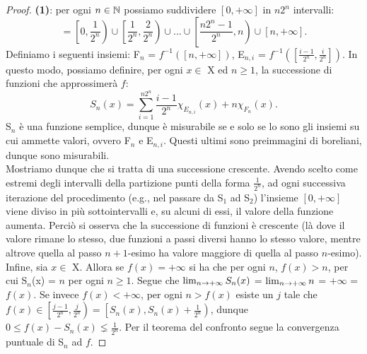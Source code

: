 \documentclass[Completo.tex]{subfiles}
\begin{document}
	\begin{proof}
		\textbf{(1)}: per ogni $n \in \bb[N]$ possiamo suddividere $[0, +\infty]$ in $n 2^n$ intervalli:
		\begin{equation*}
		[0, +\infty] = \left[0, \frac{1}{2^n}\right) \cup \left[\frac{1}{2^n}, \frac{2}{2^n}\right) \cup ... \cup \left[\frac{n2^n - 1}{2^n},n\right) \cup [n, +\infty].
		\end{equation*}
		Definiamo i seguenti insiemi: F$_n$ = $f^{-1}([n, +\infty])$, E$_{n,i}$ = $f^{-1}(\left[\frac{i-1}{2^n}, \frac{i}{2^n}\right])$. In questo modo, possiamo definire, per ogni $x \in$ X ed $n\geq1$, la successione di funzioni che approssimerà $f$:
		\begin{equation*}
		S_n(x) = \sum\limits_{i=1}^{n2^n}\frac{i-1}{2^n} \chi_{E_{n,i}}(x) + n\chi_{F_n}(x).
		\end{equation*}
		S$_n$ è una funzione semplice, dunque è misurabile se e solo se lo sono gli insiemi su cui ammette valori, ovvero F$_n$ e E$_{n,i}$. Questi ultimi sono preimmagini di boreliani, dunque sono misurabili. \\
		Mostriamo dunque che si tratta di una successione crescente. Avendo scelto come estremi degli intervalli della partizione punti della forma $\frac{1}{2^n}$, ad ogni successiva iterazione del procedimento (e.g., nel passare da S$_1$ ad S$_2$) l'insieme $[0, +\infty]$ viene diviso in più sottointervalli e, su alcuni di essi, il valore della funzione aumenta. Perciò si osserva che la successione di funzioni è crescente (là dove il valore rimane lo stesso, due funzioni a passi diversi hanno lo stesso valore, mentre altrove quella al passo $n+1$-esimo ha valore maggiore di quella al passo $n$-esimo). \\
		Infine, sia $x \in$ X. Allora se $f(x) = +\infty$ si ha che per ogni $n$, $f(x) > n$, per cui S$_n$(x) = $n$ per ogni $n\geq1$. Segue che $\lim_{n \rightarrow +\infty}S_n(x)$ = $\lim_{n \rightarrow +\infty} n$ = $+\infty$ = $f(x)$. Se invece $f(x) < +\infty$, per ogni $n > f(x)$ esiste un $j$ tale che $f(x) \in \left[\frac{j-1}{2^n}, \frac{j}{2^n}\right) = \left[S_n(x), S_n(x) + \frac{1}{2^n}\right)$, dunque $0 \leq f(x) - S_n(x) \lneq \frac{1}{2^n}$. Per il teorema del confronto segue la convergenza puntuale di S$_n$ ad $f$.
	\end{proof}
\end{document}
